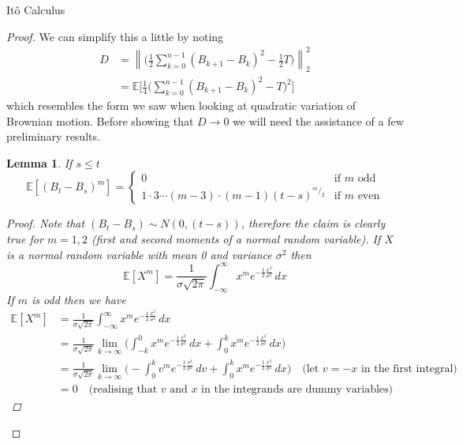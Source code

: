 \documentclass[12pt]{article}
\newtheorem{lemma}{Lemma}
\newcommand\norm[1]{\left\lVert#1\right\rVert} %
\begin{document}
\begin{section}{It\^{o} Calculus}
\begin{proof}
We can simplify this a little by noting 
\begin{align*}
	D &= \norm{\Bigg(\frac{1}{2}\sum^{n-1}_{k = 0}(B_{k+1} - B_k)^2 - \frac{1}{2}T \Bigg)}^2_2 \\
	&= \mathbb E\Bigg[\frac{1}{4}\Bigg(\sum^{n-1}_{k = 0}(B_{k+1} - B_k)^2 - T\Bigg)^2\Bigg]
\end{align*}
which resembles the form we saw when looking at quadratic variation of Brownian motion. Before showing that $D \longrightarrow 0$ we will need the assistance of a few preliminary results.

\begin{lemma} If $s \leq t$
	\begin{equation*}
		\mathbb E[(B_t - B_s)^m] =
			\begin{cases}
				0 & \text{if $m$ odd} \\
				1 \cdot 3 \cdots (m-3)\cdot (m-1)(t-s)^{^m/_2} &\text{if $m$ even}
			\end{cases}
	\end{equation*}
\begin{proof} Note that $(B_t - B_s)\sim N(0,(t-s))$, therefore the claim is clearly true for $m = 1,2$ (first and second moments of a normal random variable). If $X$ is a normal random variable with mean 0 and variance $\sigma^2$ then
\begin{equation*}
	\mathbb E[X^m] = \frac{1}{\sigma\sqrt{2\pi}}\int^\infty_{-\infty} x^me^{-\frac{1}{2}\frac{x^2}{\sigma^2}}\,dx
\end{equation*}
If $m$ is odd then we have
\begin{align*}
	\mathbb E[X^m] &= \frac{1}{\sigma\sqrt{2\pi}}\int^\infty_{-\infty} x^me^{-\frac{1}{2}\frac{x^2}{\sigma^2}}\,dx \\
	&= \frac{1}{\sigma\sqrt{2\pi}}\lim_{k\to\infty}\Bigg(\int^0_{-k} x^me^{-\frac{1}{2}\frac{x^2}{\sigma^2}}\,dx + \int^k_{0} x^me^{-\frac{1}{2}\frac{x^2}{\sigma^2}}\,dx\Bigg) \\
	&= \frac{1}{\sigma\sqrt{2\pi}}\lim_{k\to\infty}\Bigg(-\int^k_{0} v^me^{-\frac{1}{2}\frac{v^2}{\sigma^2}}\,dv + \int^k_{0} x^me^{-\frac{1}{2}\frac{x^2}{\sigma^2}}\,dx\Bigg) \quad \text{(let $v = -x$ in the first integral)} \\
	&= 0 \quad \text{(realising that $v$ and $x$ in the integrands are dummy variables)}
\end{align*}


\end{proof}
\end{lemma}
\end{proof}
\end{section}
\end{document}
